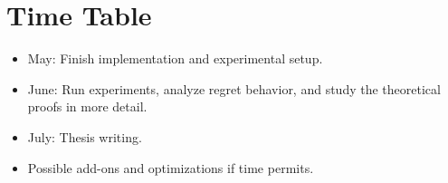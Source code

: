 \documentclass[12pt,a4paper]{article}
\begin{document}
\section{Time Table}

\begin{itemize}
    \item May: Finish implementation and experimental setup.
    \item June: Run experiments, analyze regret behavior, and study the theoretical proofs in more detail.
    \item July: Thesis writing.
    \item Possible add-ons and optimizations if time permits.
\end{itemize}



\end{document}
